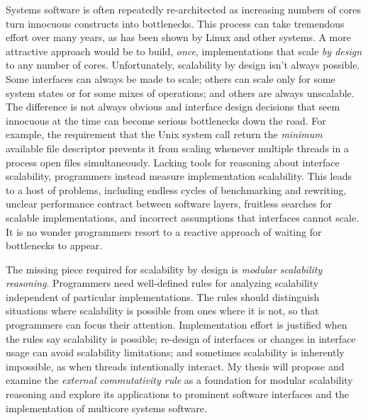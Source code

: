 %
Systems software is often repeatedly
re-architected as increasing numbers of cores
turn innocuous constructs into bottlenecks.
%
This process can take tremendous effort over many years, as has been shown by
Linux and other systems.
%
A more attractive approach would be to build, \emph{once},
implementations that scale \emph{by design} to any number
of cores.
%
Unfortunately, scalability by design isn't always possible.
%
Some interfaces can always be made to scale;
%
others can scale only for some system states or for some
mixes of operations;
%
and others are always unscalable.
%
The difference is not always obvious and interface design decisions
that seem innocuous at the time can become serious bottlenecks down
the road.  For example, the requirement
that the Unix  system call return the \emph{minimum}
available file descriptor prevents it from scaling whenever multiple
threads in a process open files simultaneously.
%
Lacking tools for reasoning about interface scalability,
programmers instead measure implementation scalability.
%
This leads to a host of problems, including endless cycles of
benchmarking and rewriting, unclear performance contract between
software layers, fruitless searches for scalable
implementations, and incorrect assumptions that interfaces cannot
scale.
%
It is no wonder programmers resort to a reactive approach of waiting for
bottlenecks to appear.

The missing piece required for scalability by design is \emph{modular
scalability reasoning}.
%
Programmers need well-defined rules for analyzing scalability
independent of particular implementations.
%
The rules should distinguish situations where scalability is possible
from ones where it is not, so that programmers can focus their
attention.
%
Implementation effort is justified when the rules say scalability is
possible; re-design of interfaces or changes in interface usage
can avoid scalability limitations; and sometimes scalability is
inherently impossible, as when threads intentionally interact.
%
My thesis will propose and examine the \emph{external commutativity
  rule} as a foundation for modular scalability reasoning and explore
its applications to prominent software interfaces and the
implementation of multicore systems software.
